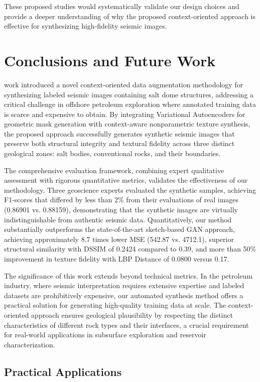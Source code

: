 \documentclass{ieeeaccess}
\begin{document}
These proposed studies would systematically validate our design choices and provide a deeper understanding of why the proposed context-oriented approach is effective for synthesizing high-fidelity seismic images.
\section{Conclusions and Future Work}
\label{sec:conclusion}

 work introduced a novel context-oriented data augmentation methodology for synthesizing labeled seismic images containing salt dome structures, addressing a critical challenge in offshore petroleum exploration where annotated training data is scarce and expensive to obtain. By integrating Variational Autoencoders for geometric mask generation with context-aware nonparametric texture synthesis, the proposed approach successfully generates synthetic seismic images that preserve both structural integrity and textural fidelity across three distinct geological zones: salt bodies, conventional rocks, and their boundaries.

The comprehensive evaluation framework, combining expert qualitative assessment with rigorous quantitative metrics, validates the effectiveness of our methodology. Three geoscience experts evaluated the synthetic samples, achieving F1-scores that differed by less than 2\% from their evaluations of real images (0.86901 vs. 0.88159), demonstrating that the synthetic images are virtually indistinguishable from authentic seismic data. Quantitatively, our method substantially outperforms the state-of-the-art sketch-based GAN approach, achieving approximately 8.7 times lower MSE (542.87 vs. 4712.1), superior structural similarity with DSSIM of 0.2424 compared to 0.39, and more than 50\% improvement in texture fidelity with LBP Distance of 0.0800 versus 0.17.

The significance of this work extends beyond technical metrics. In the petroleum industry, where seismic interpretation requires extensive expertise and labeled datasets are prohibitively expensive, our automated synthesis method offers a practical solution for generating high-quality training data at scale. The context-oriented approach ensures geological plausibility by respecting the distinct characteristics of different rock types and their interfaces, a crucial requirement for real-world applications in subsurface exploration and reservoir characterization.

\subsection{Practical Applications}
\end{document}

